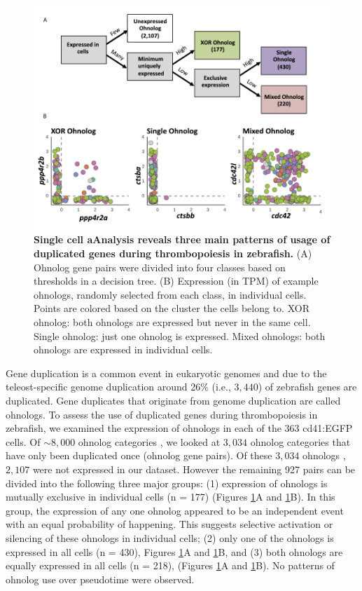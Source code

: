 \begin{figure}
    \centering
    \includegraphics[width=\textwidth]{"Figure7"}
    \caption[Single cell analysis reveals three main patterns of usage of duplicated genes during thrombopoiesis in zebrafish]{\textbf{Single cell aAnalysis reveals three main patterns of usage of duplicated genes during thrombopoiesis in zebrafish.} (A) Ohnolog gene pairs were divided into four classes based on thresholds in a decision tree. (B) Expression (in TPM) of example ohnologs, randomly selected from each class, in individual cells. Points are colored based on the cluster the cells belong to. XOR ohnolog: both ohnologs are expressed but never in the same cell. Single ohnolog: just one ohnolog is expressed. Mixed ohnologs: both ohnologs are expressed in individual cells.}
    \label{fig:ohnologs}
\end{figure}

Gene duplication is a common event in eukaryotic genomes \cite{Meyer1999-lb} and due to the teleost-specific genome duplication around 26\% (i.e., \( 3,440 \)) \cite{Howe2013-ul} of zebrafish genes are duplicated. Gene duplicates that originate from genome duplication are called ohnologs. To assess the use of duplicated genes during thrombopoiesis in zebrafish, we examined the expression of ohnologs in each of the 363 cd41:EGFP cells. Of \( \sim 8,000 \) ohnolog categories \cite{Howe2013-ul}, we looked at \( 3,034 \) ohnolog categories that have only been duplicated once (ohnolog gene pairs). Of these \( 3,034 \) ohnologs \cite{Howe2013-ul}, \( 2,107 \) were not expressed in our dataset. However the remaining 927 pairs can be divided into the following three major groups: (1) expression of ohnologs is mutually exclusive in individual cells (n = 177) (Figures \ref{fig:ohnologs}A and \ref{fig:ohnologs}B). In this group, the expression of any one ohnolog appeared to be an independent event with an equal probability of happening. This suggests selective activation or silencing of these ohnologs in individual cells; (2) only one of the ohnologs is expressed in all cells (n = 430), Figures \ref{fig:ohnologs}A and \ref{fig:ohnologs}B, and (3) both ohnologs are equally expressed in all cells (n = 218), (Figures \ref{fig:ohnologs}A and \ref{fig:ohnologs}B). No patterns of ohnolog use over pseudotime were observed.


